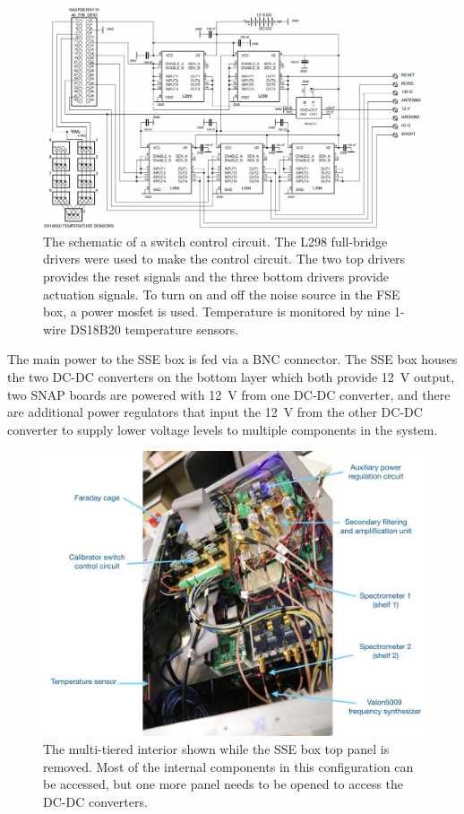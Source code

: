 \begin{figure}
\centering
\includegraphics[width=\linewidth]{Figures/calibrator}
\caption{The schematic of a switch control circuit. The L298 full-bridge drivers were used to make the control circuit. The two top drivers provides the reset signals and the three bottom drivers provide actuation signals. To turn on and off the noise source in the FSE box, a power mosfet is used. Temperature is monitored by nine 1-wire DS18B20 temperature sensors.}
\label{Fig:calibrator}
\end{figure}

The main power to the SSE box is fed via a BNC connector. The SSE box houses the two DC-DC converters on the bottom layer which both provide \SI{12}{\volt} output, two SNAP boards are powered with \SI{12}{\volt} from one DC-DC converter, and there are additional power regulators that input the \SI{12}{\volt} from the other DC-DC converter to supply lower voltage levels to multiple components in the system.

\begin{figure}
	\centering
	\includegraphics[width=\linewidth]{Figures/enclosure_ann}
	\caption{The multi-tiered interior shown while the SSE box top panel is removed. Most of the internal components in this configuration can be accessed, but one more panel needs to be opened to access the DC-DC converters.}
	\label{Fig:enclosure_ann}
\end{figure}

